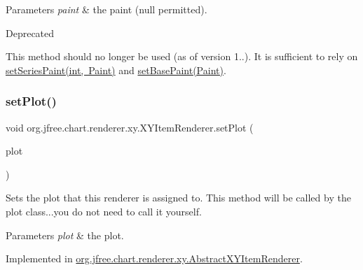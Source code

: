 \begin{DoxyParams}{Parameters}
{\em paint} & the paint ({\ttfamily null} permitted).\\
\hline
\end{DoxyParams}
\begin{DoxyRefDesc}{Deprecated}
\item[\mbox{\hyperlink{deprecated__deprecated000219}{Deprecated}}]This method should no longer be used (as of version 1..). It is sufficient to rely on \mbox{\hyperlink{interfaceorg_1_1jfree_1_1chart_1_1renderer_1_1xy_1_1_x_y_item_renderer_aeae40c1db9ca25301052d076e7d06b46}{set\+Series\+Paint(int, Paint)}} and \mbox{\hyperlink{interfaceorg_1_1jfree_1_1chart_1_1renderer_1_1xy_1_1_x_y_item_renderer_a94441ac79f4d2a5cc99fc038011b7371}{set\+Base\+Paint(\+Paint)}}. \end{DoxyRefDesc}
\mbox{\label{interfaceorg_1_1jfree_1_1chart_1_1renderer_1_1xy_1_1_x_y_item_renderer_a731979b292728dcb13c9041df3f713f5}} 
\subsubsection{\texorpdfstring{set\+Plot()}{setPlot()}}
{\footnotesize\ttfamily void org.\+jfree.\+chart.\+renderer.\+xy.\+X\+Y\+Item\+Renderer.\+set\+Plot (\begin{DoxyParamCaption}\item[{\mbox{\hyperlink{classorg_1_1jfree_1_1chart_1_1plot_1_1_x_y_plot}{X\+Y\+Plot}}}]{plot }\end{DoxyParamCaption})}

Sets the plot that this renderer is assigned to. This method will be called by the plot class...you do not need to call it yourself.


\begin{DoxyParams}{Parameters}
{\em plot} & the plot. \\
\hline
\end{DoxyParams}


Implemented in \mbox{\hyperlink{classorg_1_1jfree_1_1chart_1_1renderer_1_1xy_1_1_abstract_x_y_item_renderer_a6e2df4ddb60eb293a77d7994f316876d}{org.\+jfree.\+chart.\+renderer.\+xy.\+Abstract\+X\+Y\+Item\+Renderer}}.

